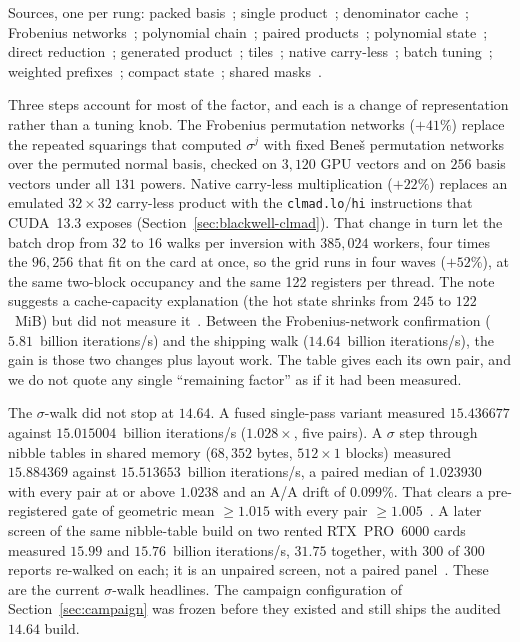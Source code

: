 Sources, one per rung: packed basis~; single
product~; denominator
cache~; Frobenius
networks~; polynomial
chain~; paired
products~; polynomial
state~; direct
reduction~; generated
product~; tiles~;
native carry-less~; batch
tuning~; weighted
prefixes~; compact
state~; shared
masks~.




Three steps account for most of the factor, and each is a change of
representation rather than a tuning knob. The Frobenius permutation
networks ($+41\%$) replace the repeated squarings that computed
$\sigma^j$ with fixed Bene\v{s} permutation networks over the permuted
normal basis,
checked on $3{,}120$ GPU vectors and on $256$ basis vectors under all
$131$ powers. Native carry-less multiplication ($+22\%$) replaces an
emulated $32\times32$ carry-less product with the
\texttt{clmad.lo}/\texttt{hi} instructions that CUDA~13.3 exposes
(Section~\ref{sec:blackwell-clmad}). That change in turn let the batch drop from 32 to 16 walks
per inversion with $385{,}024$ workers, four times the $96{,}256$ that
fit on the card at once, so the grid runs in four waves ($+52\%$), at the
same two-block occupancy and the same 122 registers per thread. The note
suggests a cache-capacity explanation (the hot state shrinks from $245$
to $122$~MiB) but did not measure it~.
Between the Frobenius-network confirmation ($5.81$~billion iterations/s) and the
shipping walk ($14.64$~billion iterations/s), the gain is those two changes plus layout
work. The table gives each its own pair, and we do not quote any single
``remaining factor'' as if it had been measured.

The $\sigma$-walk did not stop at $14.64$. A fused single-pass variant
measured $15.436677$ against $15.015004$~billion iterations/s ($1.028\times$, five
pairs). A $\sigma$ step through nibble tables in shared memory
($68{,}352$ bytes, $512\times1$ blocks) measured $15.884369$ against
$15.513653$~billion iterations/s, a paired median of $1.023930$ with every pair at or
above $1.0238$ and an A/A drift of $0.099\%$. That clears a
pre-registered gate of geometric mean $\ge1.015$ with every pair
$\ge1.005$~.
A later screen of the same nibble-table build on two rented RTX~PRO~6000
cards measured $15.99$ and $15.76$~billion iterations/s, $31.75$ together,
with 300 of 300 reports re-walked on each; it is an unpaired screen,
not a paired panel~.
These are the current $\sigma$-walk headlines. The campaign
configuration of Section~\ref{sec:campaign} was frozen before they
existed and still ships the audited $14.64$ build.

